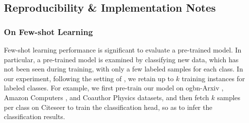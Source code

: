\vspace{-0.11in}
\subsection{Reproducibility \& Implementation Notes}

\vspace{-0.01in}
\subsubsection{\textbf{On Few-shot Learning}}
Few-shot learning performance is significant to evaluate a pre-trained model. In particular, a pre-trained model is examined by classifying new data, which has not been seen during training, with only a few labeled samples for each class.
In our experiment, following the setting of \citet{xia2024opengraph}, we retain up to $k$ training instances for labeled classes.  
For example, we first pre-train our model on ogbn-Arxiv \cite{nips2020arxiv}, Amazon Computers \cite{physics_computers}, and Coauthor Physics \cite{physics_computers} datasets, and then fetch $k$ samples per class on Citeseer \cite{citeseerandpubmed} to train the classification head, so as to infer the classification results.

